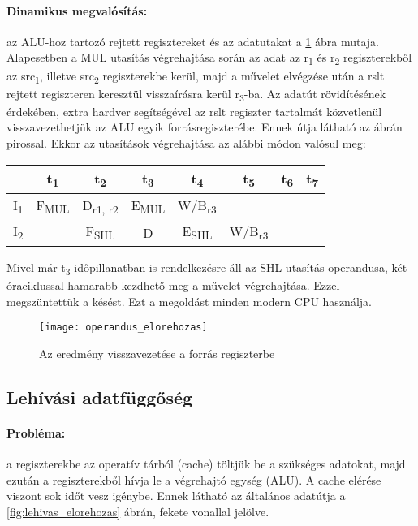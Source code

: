 \paragraph{Dinamikus megvalósítás:} az ALU-hoz tartozó rejtett regisztereket és az adatutakat a \ref{fig:operandus_elorehozas} ábra mutaja.
Alapesetben a MUL utasítás végrehajtása során az adat az r\textsubscript{1} és r\textsubscript{2} regiszterekből az src\textsubscript{1}, illetve src\textsubscript{2} regiszterekbe kerül, majd a művelet elvégzése után a rslt rejtett regiszteren keresztül visszaírásra kerül r\textsubscript{3}-ba.
Az adatút rövidítésének érdekében, extra hardver segítségével az rslt regiszter tartalmát közvetlenül visszavezethetjük az ALU egyik forrásregiszterébe. Ennek útja látható az ábrán pirossal.
Ekkor az utasítások végrehajtása az alábbi módon valósul meg:
\begin{center}
    \begin{tabular}{ c | c | c | c | c | c | c | c}
                           & t\textsubscript{1}   & t\textsubscript{2}      & t\textsubscript{3}   & t\textsubscript{4}    & t\textsubscript{5}    & t\textsubscript{6} & t\textsubscript{7} \\
        \hline
        I\textsubscript{1} & F\textsubscript{MUL} & D\textsubscript{r1, r2} & E\textsubscript{MUL} & W/B\textsubscript{r3} &                       &                                         \\
        \hline
        I\textsubscript{2} &                      & F\textsubscript{SHL}    & D                    & E\textsubscript{SHL}  & W/B\textsubscript{r3} &                    &
    \end{tabular}
\end{center}
Mivel már t\textsubscript{3} időpillanatban is rendelkezésre áll az SHL utasítás operandusa, két óraciklussal hamarabb kezdhető meg a művelet végrehajtása. Ezzel megszüntettük a késést.
Ezt a megoldást minden modern CPU használja.

\begin{figure}[H]
    \texttt{[image: operandus\_elorehozas]}
    \centering
    \caption{Az eredmény visszavezetése a forrás regiszterbe}
    \label{fig:operandus_elorehozas}
\end{figure}

\subsection{Lehívási adatfüggőség}
\paragraph{Probléma:} a regiszterekbe az operatív tárból (cache) töltjük be a szükséges adatokat, majd ezután a regiszterekből hívja le a végrehajtó egység (ALU).
A cache elérése viszont sok időt vesz igénybe.
Ennek látható az általános adatútja a \ref{fig:lehivas_elorehozas} ábrán, fekete vonallal jelölve.
